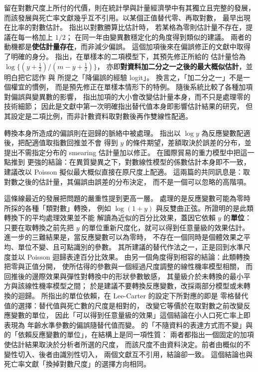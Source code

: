 \documentclass[UTF8, fontset=macnew, a4paper, 12pt]{ctexart}
\begin{document}
留在對數尺度上所付的代價，則在統計學與計量經濟學中有其獨立且完整的發展，
而該發展與死亡率文獻幾乎互不引用。以某個正值替代零、再取對數，
最早出現在比率的對數估計。\citet{haldane1956} 指出以對數勝算比估計時，
若某格為零則估計量不存在，提議在每一格加上 $1/2$；
\citet{anscombe1956} 在同一年由變異數穩定化的角度得到類似的建議。
兩者的動機都是\textbf{使估計量存在}，而非減少偏誤。
這個加項後來在偏誤修正的文獻中取得了明確的身分。
\citet[\S3.3]{firth1993} 指出，在單樣本的二項模型下，其預先修正所給的
估計量恰為 $\log\{(y+\tfrac12)/(m-y+\tfrac12)\}$，
亦即\textbf{對資料加二分之一之後的最大概似估計}，並明白把它認作
\citet{haldane1956} 與 \citet{anscombe1956} 所提之「降偏誤的經驗 logit」。
換言之，「加二分之一」不是一個權宜的慣例，
而是預先修正在單樣本情形下的特例。
\citet{gart1967} 隨後系統比較了各種加項對偏誤與變異數的影響，
指出加項的大小會改變估計量本身，而不只是處理零的技術細節；
\citet{gart1967} 因此是文獻中第一次明確指出替代值本身即影響估計結果的研究，
但其設定是二項比例，而非計數資料取對數後再作雙線性配適。

轉換本身所造成的偏誤則在迴歸的脈絡中被處理。
\citet{duan1983} 指出以 $\log y$ 為反應變數配適後，把配適值取指數回推並不會
得到 $y$ 的條件期望，差額取決於誤差的分布，並提出不需指定分布的 smearing
估計量加以修正。\citet{santossilva2006} 在國際貿易的重力模型中把這一點推到
更強的結論：在異質變異之下，對數線性模型的係數估計本身即不一致，
建議改以 Poisson 擬似最大概似直接在原尺度上配適。
這兩篇的共同訊息是：取對數之後的估計量，其偏誤由誤差的分布決定，
而不是一個可以忽略的高階項。

這條線最近的發展把問題的嚴重性提到更高一層。
\citet{chenroth2024} 處理的是反應變數可能為零時所採的各種「類對數」轉換，
例如 $\log(1+y)$ 與反雙曲正弦。所證明的是此類轉換下的平均處理效果並不能
解讀為近似的百分比效果，蓋因它依賴 $y$ 的\textbf{單位}：
只要在取轉換之前先把 $y$ 的單位重新尺度化，就可以得到任意量級的效果估計。
進一步的三難結果是，當反應變數可以為零時，
不存在一個同時是個體效果之平均、單位不變、且可點識別的參數。
其所建議的替代作法之一，正是回到水準尺度並以 Poisson 迴歸表達百分比效果。
\citet{mullahy2024} 由另一個角度得到相容的結論：此類轉換把零與正值分開，
使所估得的參數與一個經過尺度調整的線性機率模型相關，
而回推後的邊際效果與彈性對轉換中的形狀參數敏感，
其量級介於未轉換的最小平方與該線性機率模型之間；
於是建議不要轉換反應變數，改採兩部分模型或未轉換的迴歸。
\citet{chenroth2024} 所指出的單位依賴，在 Lee-Carter 的設定下所對應的即是
零格替代值的選擇：替代值與死亡數的尺度是相對的，
改變它等價於在取對數之前改變反應變數的單位，
因此「可以得到任意量級的效果」這個結論在小人口死亡率上即表現為
年齡水準參數的偏誤隨替代值而變。
\citet[\S6.2]{kosmidis2014} 的「不隨資料的表達方式而不變」與
\citet{chenroth2024} 的「依賴反應變數的單位」，在結構上是同一項性質：
兩者都指出一個固定的加項使估計結果取決於分析者所選的尺度，
而該尺度不由資料決定。前者由概似的不變性切入、後者由識別性切入，
兩個文獻互不引用，結論卻一致。
這個結論也與死亡率文獻「換掉對數尺度」的選擇方向相同。
\end{document}

